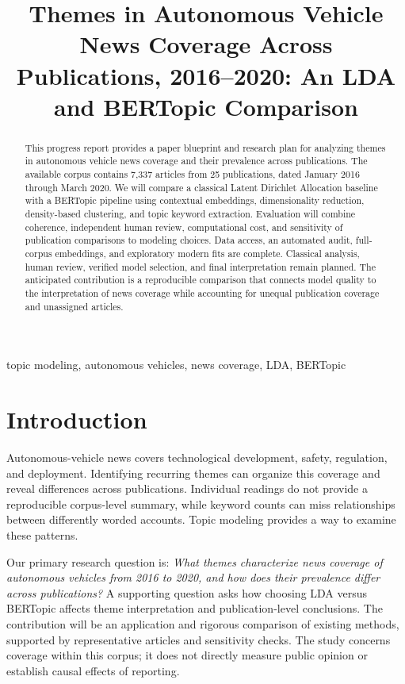 \documentclass[conference]{IEEEtran}
\title{Themes in Autonomous Vehicle News Coverage Across Publications, 2016--2020: An LDA and BERTopic Comparison}
\author{\IEEEauthorblockN{Laura Banaszewski, Mary Kate Carara, and Lauren Gamber}}
\begin{document}
\maketitle

\begin{abstract}
This progress report provides a paper blueprint and research plan for analyzing themes in autonomous vehicle news coverage and their prevalence across publications. The available corpus contains 7,337 articles from 25 publications, dated January 2016 through March 2020. We will compare a classical Latent Dirichlet Allocation baseline with a BERTopic pipeline using contextual embeddings, dimensionality reduction, density-based clustering, and topic keyword extraction. Evaluation will combine coherence, independent human review, computational cost, and sensitivity of publication comparisons to modeling choices. Data access, an automated audit, full-corpus embeddings, and exploratory modern fits are complete. Classical analysis, human review, verified model selection, and final interpretation remain planned. The anticipated contribution is a reproducible comparison that connects model quality to the interpretation of news coverage while accounting for unequal publication coverage and unassigned articles.
\end{abstract}

\begin{IEEEkeywords}
topic modeling, autonomous vehicles, news coverage, LDA, BERTopic
\end{IEEEkeywords}

\section{Introduction}
Autonomous-vehicle news covers technological development, safety, regulation, and deployment. Identifying recurring themes can organize this coverage and reveal differences across publications. Individual readings do not provide a reproducible corpus-level summary, while keyword counts can miss relationships between differently worded accounts. Topic modeling provides a way to examine these patterns.

Our primary research question is: \emph{What themes characterize news coverage of autonomous vehicles from 2016 to 2020, and how does their prevalence differ across publications?} A supporting question asks how choosing LDA versus BERTopic affects theme interpretation and publication-level conclusions. The contribution will be an application and rigorous comparison of existing methods, supported by representative articles and sensitivity checks. The study concerns coverage within this corpus; it does not directly measure public opinion or establish causal effects of reporting.
\end{document}
